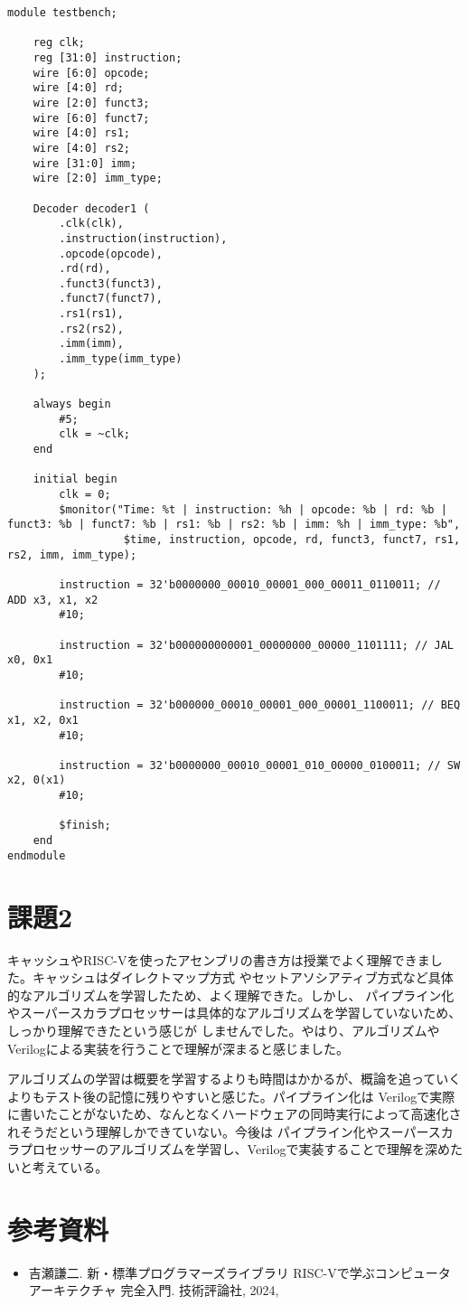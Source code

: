 \documentclass{jlreq}
\begin{document}
\begin{lstlisting}[caption={テストケース}]
	module testbench;

    reg clk;
    reg [31:0] instruction;
    wire [6:0] opcode;
    wire [4:0] rd;
    wire [2:0] funct3;
    wire [6:0] funct7;
    wire [4:0] rs1;
    wire [4:0] rs2;
    wire [31:0] imm;
    wire [2:0] imm_type;

    Decoder decoder1 (
        .clk(clk),
        .instruction(instruction),
        .opcode(opcode),
        .rd(rd),
        .funct3(funct3),
        .funct7(funct7),
        .rs1(rs1),
        .rs2(rs2),
        .imm(imm),
        .imm_type(imm_type)
    );

	always begin
		#5;
		clk = ~clk;
	end

    initial begin
		clk = 0;
        $monitor("Time: %t | instruction: %h | opcode: %b | rd: %b | funct3: %b | funct7: %b | rs1: %b | rs2: %b | imm: %h | imm_type: %b",
                  $time, instruction, opcode, rd, funct3, funct7, rs1, rs2, imm, imm_type);
        
        instruction = 32'b0000000_00010_00001_000_00011_0110011; // ADD x3, x1, x2
        #10;

        instruction = 32'b000000000001_00000000_00000_1101111; // JAL x0, 0x1
        #10;

        instruction = 32'b000000_00010_00001_000_00001_1100011; // BEQ x1, x2, 0x1
        #10;

        instruction = 32'b0000000_00010_00001_010_00000_0100011; // SW x2, 0(x1)
        #10;

        $finish;
    end
endmodule
\end{lstlisting}

\section{課題2}

キャッシュやRISC-Vを使ったアセンブリの書き方は授業でよく理解できました。キャッシュはダイレクトマップ方式
やセットアソシアティブ方式など具体的なアルゴリズムを学習したため、よく理解できた。しかし、
パイプライン化やスーパースカラプロセッサーは具体的なアルゴリズムを学習していないため、しっかり理解できたという感じが
しませんでした。やはり、アルゴリズムやVerilogによる実装を行うことで理解が深まると感じました。

アルゴリズムの学習は概要を学習するよりも時間はかかるが、概論を追っていくよりもテスト後の記憶に残りやすいと感じた。パイプライン化は
Verilogで実際に書いたことがないため、なんとなくハードウェアの同時実行によって高速化されそうだという理解しかできていない。今後は
パイプライン化やスーパースカラプロセッサーのアルゴリズムを学習し、Verilogで実装することで理解を深めたいと考えている。

\section{参考資料}
\begin{itemize}
	\item 吉瀬謙二. 新・標準プログラマーズライブラリ
	RISC-Vで学ぶコンピュータアーキテクチャ 完全入門. 技術評論社, 2024,
\end{itemize}
\end{document}
